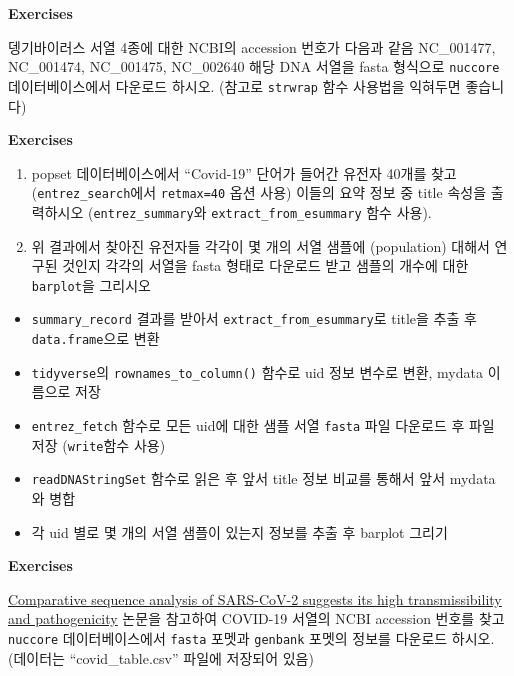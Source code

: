 \documentclass[
]{book}
\providecommand{\tightlist}{%
  \setlength{\itemsep}{0pt}\setlength{\parskip}{0pt}}
\begin{document}
\textbf{Exercises }

뎅기바이러스 서열 4종에 대한 NCBI의 accession 번호가 다음과 같음 NC\_001477, NC\_001474, NC\_001475, NC\_002640 해당 DNA 서열을 fasta 형식으로 \texttt{nuccore} 데이터베이스에서 다운로드 하시오. (참고로 \texttt{strwrap} 함수 사용법을 익혀두면 좋습니다)

\textbf{Exercises }

\begin{enumerate}
\def\labelenumi{\arabic{enumi}.}
\item
  popset 데이터베이스에서 ``Covid-19'' 단어가 들어간 유전자 40개를 찾고 (\texttt{entrez\_search}에서 \texttt{retmax=40} 옵션 사용) 이들의 요약 정보 중 title 속성을 출력하시오 (\texttt{entrez\_summary}와 \texttt{extract\_from\_esummary} 함수 사용).
\item
  위 결과에서 찾아진 유전자들 각각이 몇 개의 서열 샘플에 (population) 대해서 연구된 것인지 각각의 서열을 fasta 형태로 다운로드 받고 샘플의 개수에 대한 \texttt{barplot}을 그리시오
\end{enumerate}

\begin{itemize}
\tightlist
\item
  \texttt{summary\_record} 결과를 받아서 \texttt{extract\_from\_esummary}로 title을 추출 후 \texttt{data.frame}으로 변환
\item
  \texttt{tidyverse}의 \texttt{rownames\_to\_column()} 함수로 uid 정보 변수로 변환, mydata 이름으로 저장
\item
  \texttt{entrez\_fetch} 함수로 모든 uid에 대한 샘플 서열 \texttt{fasta} 파일 다운로드 후 파일 저장 (\texttt{write}함수 사용)
\item
  \texttt{readDNAStringSet} 함수로 읽은 후 앞서 title 정보 비교를 통해서 앞서 mydata 와 병합
\item
  각 uid 별로 몇 개의 서열 샘플이 있는지 정보를 추출 후 barplot 그리기
\end{itemize}

\textbf{Exercises }

\href{https://www.ncbi.nlm.nih.gov/pmc/articles/PMC7938774/}{Comparative sequence analysis of SARS-CoV-2 suggests its high transmissibility and pathogenicity} 논문을 참고하여 COVID-19 서열의 NCBI accession 번호를 찾고 \texttt{nuccore} 데이터베이스에서 \texttt{fasta} 포멧과 \texttt{genbank} 포멧의 정보를 다운로드 하시오. (데이터는 ``covid\_table.csv'' 파일에 저장되어 있음)
\end{document}
